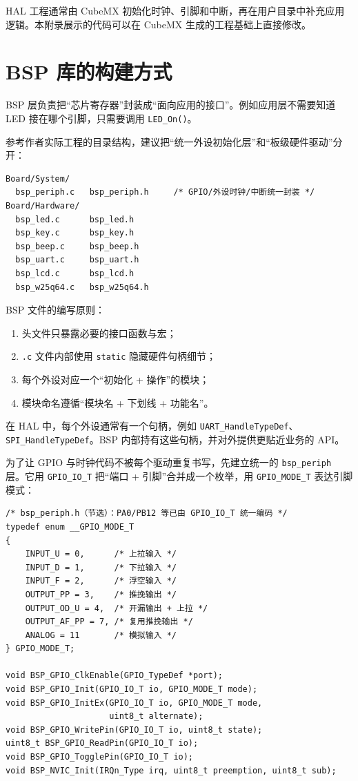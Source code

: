 HAL 工程通常由 CubeMX 初始化时钟、引脚和中断，再在用户目录中补充应用逻辑。本附录展示的代码可以在 CubeMX 生成的工程基础上直接修改。

\section{BSP 库的构建方式}

BSP 层负责把“芯片寄存器”封装成“面向应用的接口”。例如应用层不需要知道 LED 接在哪个引脚，只需要调用 \texttt{LED\_On()}。

参考作者实际工程的目录结构，建议把“统一外设初始化层”和“板级硬件驱动”分开：

\begin{lstlisting}
Board/System/
  bsp_periph.c   bsp_periph.h     /* GPIO/外设时钟/中断统一封装 */
Board/Hardware/
  bsp_led.c      bsp_led.h
  bsp_key.c      bsp_key.h
  bsp_beep.c     bsp_beep.h
  bsp_uart.c     bsp_uart.h
  bsp_lcd.c      bsp_lcd.h
  bsp_w25q64.c   bsp_w25q64.h
\end{lstlisting}

BSP 文件的编写原则：

\begin{enumerate}
\item 头文件只暴露必要的接口函数与宏；
\item \texttt{.c} 文件内部使用 \texttt{static} 隐藏硬件句柄细节；
\item 每个外设对应一个“初始化 + 操作”的模块；
\item 模块命名遵循“模块名 + 下划线 + 功能名”。
\end{enumerate}

在 HAL 中，每个外设通常有一个句柄，例如 \texttt{UART\_HandleTypeDef}、 \texttt{SPI\_HandleTypeDef}。BSP 内部持有这些句柄，并对外提供更贴近业务的 API。

为了让 GPIO 与时钟代码不被每个驱动重复书写，先建立统一的 \texttt{bsp\_periph} 层。它用 \texttt{GPIO\_IO\_T} 把“端口 + 引脚”合并成一个枚举，用 \texttt{GPIO\_MODE\_T} 表达引脚模式：

\begin{lstlisting}[style=c]
/* bsp_periph.h（节选）：PA0/PB12 等已由 GPIO_IO_T 统一编码 */
typedef enum __GPIO_MODE_T
{
    INPUT_U = 0,      /* 上拉输入 */
    INPUT_D = 1,      /* 下拉输入 */
    INPUT_F = 2,      /* 浮空输入 */
    OUTPUT_PP = 3,    /* 推挽输出 */
    OUTPUT_OD_U = 4,  /* 开漏输出 + 上拉 */
    OUTPUT_AF_PP = 7, /* 复用推挽输出 */
    ANALOG = 11       /* 模拟输入 */
} GPIO_MODE_T;

void BSP_GPIO_ClkEnable(GPIO_TypeDef *port);
void BSP_GPIO_Init(GPIO_IO_T io, GPIO_MODE_T mode);
void BSP_GPIO_InitEx(GPIO_IO_T io, GPIO_MODE_T mode,
                     uint8_t alternate);
void BSP_GPIO_WritePin(GPIO_IO_T io, uint8_t state);
uint8_t BSP_GPIO_ReadPin(GPIO_IO_T io);
void BSP_GPIO_TogglePin(GPIO_IO_T io);
void BSP_NVIC_Init(IRQn_Type irq, uint8_t preemption, uint8_t sub);
\end{lstlisting}

